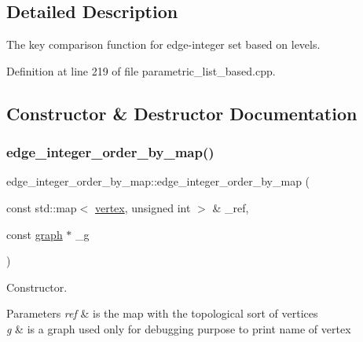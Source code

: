 \subsection{Detailed Description}
The key comparison function for edge-\/integer set based on levels. 

Definition at line 219 of file parametric\+\_\+list\+\_\+based.\+cpp.



\subsection{Constructor \& Destructor Documentation}
\mbox{\label{classedge__integer__order__by__map_a0009ff6e94b0b34f1307c252ccc2ce44}} 
\subsubsection{\texorpdfstring{edge\+\_\+integer\+\_\+order\+\_\+by\+\_\+map()}{edge\_integer\_order\_by\_map()}}
{\footnotesize\ttfamily edge\+\_\+integer\+\_\+order\+\_\+by\+\_\+map\+::edge\+\_\+integer\+\_\+order\+\_\+by\+\_\+map (\begin{DoxyParamCaption}\item[{const std\+::map$<$ \hyperlink{graph_8hpp_abefdcf0544e601805af44eca032cca14}{vertex}, unsigned int $>$ \&}]{\+\_\+ref,  }\item[{const \hyperlink{structgraph}{graph} $\ast$}]{\+\_\+g }\end{DoxyParamCaption})\hspace{0.3cm}{\ttfamily [inline]}}



Constructor. 


\begin{DoxyParams}{Parameters}
{\em ref} & is the map with the topological sort of vertices \\
\hline
{\em g} & is a graph used only for debugging purpose to print name of vertex \\
\hline
\end{DoxyParams}


